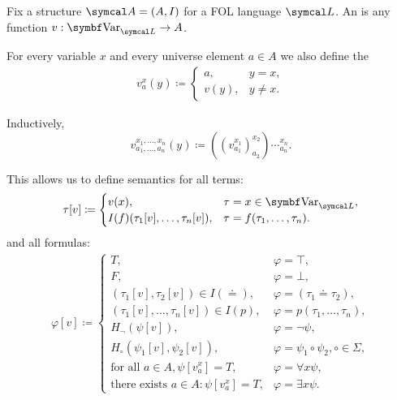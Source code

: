 \begin{definition}\label{def:first_order_evaluation}\cite[25]{Lectures:logic_programming}
  Fix a structure \( \Cal{A} = (A, I) \) for a FOL language \( \Cal{L} \). An  is any function \( v: \Bold{Var}_{\Cal{L}} \to A \).

  For every variable \( x \) and every universe element \( a \in A \) we also define the 
  \begin{align*}
    v_a^x(y) \coloneqq \begin{cases}
      a,    &y = x, \\
      v(y), &y \neq x.
    \end{cases}
  \end{align*}

  Inductively,
  \begin{equation*}
    v_{a_1, \ldots, a_n}^{x_1, \ldots, x_n}(y) \coloneqq ((v_{a_1}^{x_1})_{a_2}^{x_2})\cdots_{a_n}^{x_n}.
  \end{equation*}

  This allows us to define semantics for all terms:
  \begin{align*}
    \tau[v] \coloneqq \begin{cases}
      v(x),                               &\tau = x \in \Bold{Var}_{\Cal{L}}, \\
      I(f)(\tau_1[v], \ldots, \tau_n[v]), &\tau = f(\tau_1, \ldots, \tau_n).
    \end{cases}
  \end{align*}
  and all formulas:
  \begin{align*}
    \varphi[v] \coloneqq \begin{cases}
      T,                                                &\varphi = \top, \\
      F,                                                &\varphi = \bot, \\
      (\tau_1[v], \tau_2[v]) \in I(\doteq),             &\varphi = (\tau_1 \doteq \tau_2), \\
      (\tau_1[v], \ldots, \tau_n[v]) \in I(p),          &\varphi = p(\tau_1, \ldots, \tau_n), \\
      H_\neg(\psi[v]),                                  &\varphi = \neg \psi, \\
      H_\circ(\psi_1[v], \psi_2[v]),                    &\varphi = \psi_1 \circ \psi_2, \circ \in \Sigma, \\
      \text{for all } a \in A, \psi[v_a^x] = T,         &\varphi = \forall x \psi, \\
      \text{there exists } a \in A: \psi[v_a^x] = T,    &\varphi = \exists x \psi.
    \end{cases}
  \end{align*}


\end{definition}
